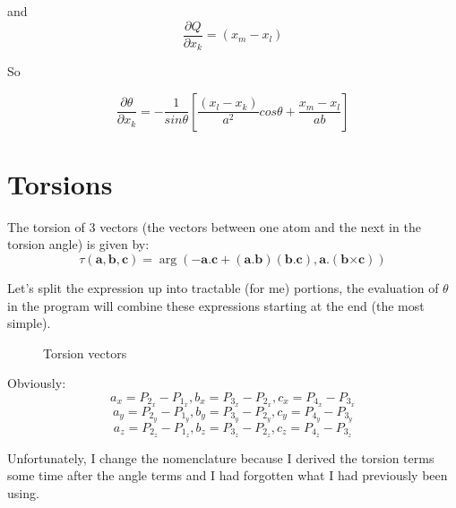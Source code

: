and 
\begin{displaymath}
  \frac{\partial Q}{\partial x_k} = (x_m-x_l)
\end{displaymath}

So 

\begin{equation}
  \frac{\partial \theta}{\partial x_k} = -\frac{1}{sin\theta} [\frac{(x_l-x_k)}{a^2}cos\theta + \frac{x_m-x_l}{ab}]
\end{equation}



\section{Torsions}
The torsion of 3 vectors (the vectors between one atom and the next in
the torsion angle) is given by:
\begin{equation}
  \label{eq:8}
  \tau(\mathbf{a},\mathbf{b},\mathbf{c}) = \arg(-\mathbf{a}.\mathbf{c}+(\mathbf{a}.\mathbf{b})(\mathbf{b}.\mathbf{c}), \mathbf{a}.(\mathbf{b} \mathbf{\times}\mathbf{c}))
\end{equation}


Let's split the expression up into tractable (for me) portions, the
evaluation of $\theta$ in the program will combine these expressions
starting at the end (the most simple).

\begin{figure}[htbp]
  \centering
  \leavevmode
  \epsfxsize=50mm
  \caption{Torsion vectors}
  \label{fig:torsion-vectors}
\end{figure}

Obviously: 
\begin{displaymath}
  a_x = P_{2_x}-P_{1_x} , b_x = P_{3_x}-P_{2_x} , c_x = P_{4_x}-P_{3_x}
\end{displaymath}
\begin{displaymath}
  a_y = P_{2_y}-P_{1_y} , b_y = P_{3_y}-P_{2_y} , c_y = P_{4_y}-P_{3_y}
\end{displaymath}
\begin{displaymath}
  a_z = P_{2_z}-P_{1_z} , b_z = P_{3_z}-P_{2_z} , c_z = P_{4_z}-P_{3_z}
\end{displaymath}

Unfortunately, I change the nomenclature because I derived the torsion
terms some time after the angle terms and I had forgotten what I had
previously been using.


